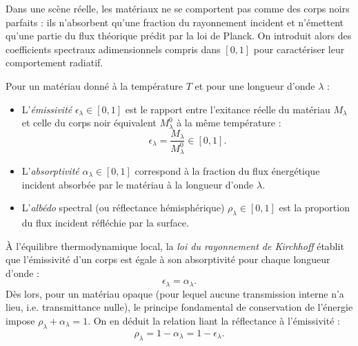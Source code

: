 Dans une scène réelle, les matériaux ne se comportent pas comme des corps noirs parfaits : ils n'absorbent qu'une fraction du rayonnement incident et n'émettent qu'une partie du flux théorique prédit par la loi de Planck. On introduit alors des coefficients spectraux adimensionnels compris dans $[0, 1]$ pour caractériser leur comportement radiatif.

\begin{definition}
    Pour un matériau donné à la température $T$ et pour une longueur d'onde $\lambda$ :
    \begin{itemize}
        \item L'\emph{émissivité} $\epsilon_\lambda \in [0, 1]$ est le rapport entre l'exitance réelle du matériau $M_\lambda$ et celle du corps noir équivalent $M_\lambda^0$ à la même température :
        \begin{equation}
            \epsilon_\lambda = \frac{M_\lambda}{M_\lambda^0} \in [0, 1].
        \end{equation}
        \item L'\emph{absorptivité} $\alpha_\lambda \in [0, 1]$ correspond à la fraction du flux énergétique incident absorbée par le matériau à la longueur d'onde $\lambda$.
        \item L'\emph{albédo} spectral (ou réflectance hémisphérique) $\rho_\lambda \in [0, 1]$ est la proportion du flux incident réfléchie par la surface.
    \end{itemize}
\end{definition}

\begin{proposition}
    À l'équilibre thermodynamique local, la \emph{loi du rayonnement de Kirchhoff} établit que l'émissivité d'un corps est égale à son absorptivité pour chaque longueur d'onde :
    \begin{equation}
        \epsilon_\lambda = \alpha_\lambda.
    \end{equation}
    Dès lors, pour un matériau opaque (pour lequel aucune transmission interne n'a lieu, i.e. transmittance nulle), le principe fondamental de conservation de l'énergie impose $\rho_\lambda + \alpha_\lambda = 1$. On en déduit la relation liant la réflectance à l'émissivité :
    \begin{equation}
        \rho_\lambda = 1 - \alpha_\lambda = 1 - \epsilon_\lambda.
    \end{equation}
\end{proposition}

